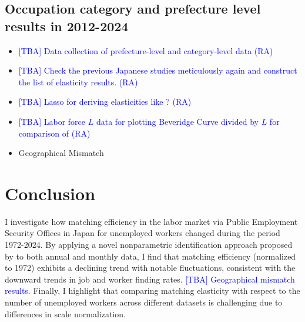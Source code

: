 \documentclass[12pt]{article}
\begin{document}
\subsection{Occupation category and prefecture level results in 2012-2024}


\begin{itemize}
    \item \textcolor{blue}{[TBA] Data collection of prefecture-level and category-level data (RA)}
    \item \textcolor{blue}{[TBA] Check the previous Japanese studies meticulously again and construct the list of elasticity results. (RA)}
    \item \textcolor{blue}{[TBA] Lasso for deriving elasticities like \cite{lange2020beyond}? (RA)}
    \item \textcolor{blue}{[TBA] Labor force $L$ data for plotting Beveridge Curve divided by $L$ for comparison of \cite{elsby2015beveridge} (RA)}
    \item Geographical Mismatch
\end{itemize}



\section{Conclusion}

I investigate how matching efficiency in the labor market via Public Employment Security Offices in Japan for unemployed workers changed during the period 1972-2024. By applying a novel nonparametric identification approach proposed by \cite{lange2020beyond} to both annual and monthly data, I find that matching efficiency (normalized to 1972) exhibits a declining trend with notable fluctuations, consistent with the downward trends in job and worker finding rates. \textcolor{blue}{[TBA] Geographical mismatch results.} Finally, I highlight that comparing matching elasticity with respect to the number of unemployed workers across different datasets is challenging due to differences in scale normalization.



\end{document}
